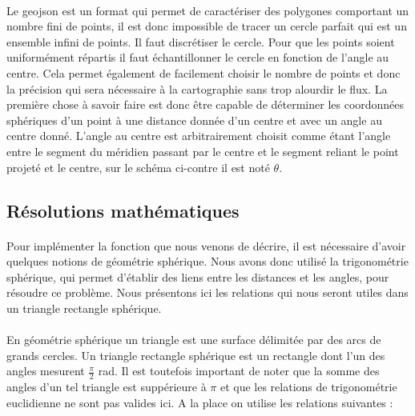 \documentclass[a4paper]{report}
\begin{document}
\paragraph{} Le geojson est un format qui permet de caractériser des polygones comportant un nombre fini de points, il est donc impossible de tracer un cercle parfait qui est un ensemble infini de points. Il faut discrétiser le cercle. Pour que les points soient uniformément répartis il faut échantillonner le cercle en fonction de l'angle au centre. Cela permet également de facilement choisir le nombre de points et donc la précision qui sera nécessaire à la cartographie sans trop alourdir le flux. La première chose à savoir faire est donc être capable de déterminer les coordonnées sphériques d'un point à une distance donnée d'un centre et avec un angle au centre donné. L'angle au centre est arbitrairement choisit comme étant l'angle entre le segment du méridien passant par le centre et le segment reliant le point projeté et le centre, sur le schéma ci-contre il est noté $\theta$.

\subsection{Résolutions mathématiques}

\paragraph{} Pour implémenter la fonction que nous venons de décrire, il est nécessaire d'avoir quelques notions de géométrie sphérique. Nous avons donc utilisé la trigonométrie sphérique, qui permet d'établir des liens entre les distances et les angles, pour résoudre ce problème. Nous présentons ici les relations qui nous seront utiles dans un triangle rectangle sphérique.

\paragraph{} En géométrie sphérique un triangle est une surface délimitée par des arcs de grands cercles. Un triangle rectangle sphérique est un rectangle dont l'un des angles mesurent $\frac{\pi}{2}$ rad. Il est toutefois important de noter que la somme des angles d'un tel triangle est suppérieure à $\pi$ et que les relations de trigonométrie euclidienne ne sont pas valides ici. A la place on utilise les relations suivantes :
\end{document}
